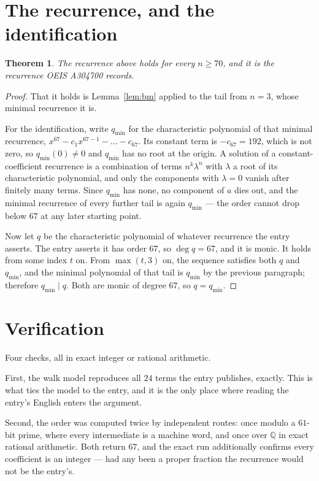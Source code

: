 \documentclass[11pt,a4paper]{article}
\theoremstyle{plain}
\newtheorem{theorem}{Theorem}
\theoremstyle{definition}
\begin{document}
\section{The recurrence, and the identification}

\begin{theorem}
The recurrence above holds for every $n\ge70$, and it is the recurrence OEIS A304700 records.
\end{theorem}

\begin{proof}
That it holds is Lemma~\ref{lem:bm} applied to the tail from $n=3$, whose minimal
recurrence it is.

For the identification, write $q_{\min}$ for the characteristic polynomial of that minimal
recurrence, $x^{67}-c_1x^{67-1}-\dots-c_{67}$. Its constant term is
$-c_{67}=192$, which is not zero, so $q_{\min}(0)\neq0$ and $q_{\min}$ has no
root at the origin. A solution of a constant-coefficient recurrence is a combination of terms
$n^{k}\lambda^{n}$ with $\lambda$ a root of its characteristic polynomial, and only the
components with $\lambda=0$ vanish after finitely many terms. Since $q_{\min}$ has none, no
component of $a$ dies out, and the minimal recurrence of every further tail is again
$q_{\min}$ --- the order cannot drop below $67$ at any later starting point.

Now let $q$ be the characteristic polynomial of whatever recurrence the entry asserts. The
entry asserts it has order $67$, so $\deg q=67$, and it is monic. It holds from some
index $t$ on. From $\max(t,3)$ on, the sequence satisfies both $q$ and $q_{\min}$, and
the minimal polynomial of that tail is $q_{\min}$ by the previous paragraph; therefore
$q_{\min}\mid q$. Both are monic of degree $67$, so $q=q_{\min}$.
\end{proof}

\section{Verification}

Four checks, all in exact integer or rational arithmetic.

First, the walk model reproduces all $24$ terms the entry publishes, exactly. This is
what ties the model to the entry, and it is the only place where reading the entry's English
enters the argument.

Second, the order was computed twice by independent routes: once modulo a $61$-bit prime, where
every intermediate is a machine word, and once over $\mathbb{Q}$ in exact rational arithmetic.
Both return $67$, and the exact run additionally confirms every coefficient is an integer
--- had any been a proper fraction the recurrence would not be the entry's.
\end{document}
